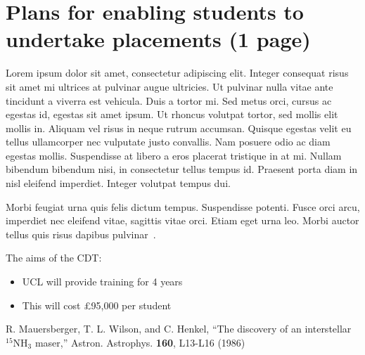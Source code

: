 \documentclass[a4paper,onecolumn,11pt]{article}
\begin{document}
\section*{Plans for enabling students to undertake placements (1 page)}

 Lorem ipsum dolor sit amet, consectetur adipiscing elit. Integer consequat risus sit amet mi ultrices at pulvinar augue ultricies. Ut pulvinar nulla vitae ante tincidunt a viverra est vehicula. Duis a tortor mi. Sed metus orci, cursus ac egestas id, egestas sit amet ipsum. Ut rhoncus volutpat tortor, sed mollis elit mollis in. Aliquam vel risus in neque rutrum accumsan. Quisque egestas velit eu tellus ullamcorper nec vulputate justo convallis. Nam posuere odio ac diam egestas mollis. Suspendisse at libero a eros placerat tristique in at mi. Nullam bibendum bibendum nisi, in consectetur tellus tempus id. Praesent porta diam in nisl eleifend imperdiet. Integer volutpat tempus dui.

 Morbi feugiat urna quis felis dictum tempus. Suspendisse potenti. Fusce orci arcu, imperdiet nec eleifend vitae, sagittis vitae orci. Etiam eget urna leo. Morbi auctor tellus quis risus dapibus pulvinar~\citep{Mauersberger:1986}.

 The aims of the CDT: 
\begin{itemize}
\item UCL will provide training for 4 years
\item This will cost \pounds 95,000 per student
\end{itemize}

%
%
\begin{thebibliography}{1}
R. Mauersberger, T. L. Wilson, and C. Henkel,
``The discovery of an interstellar $^{15}$NH$_3$ maser,''
Astron. Astrophys. {\bf 160}, L13-L16 (1986)
\end{thebibliography}
\end{document}
